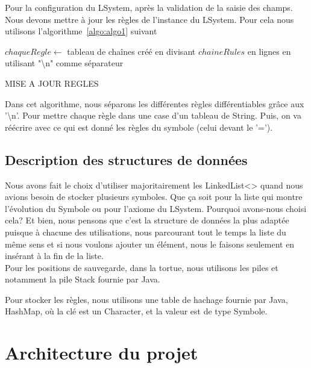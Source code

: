 \documentclass[12pt]{article}
\begin{document}
Pour la configuration du LSystem, après la validation de la saisie des champs. Nous devons mettre à jour les règles de l'instance du LSystem. Pour cela nous utilisons l'algorithme~\ref{algo:algo1} suivant\\
\begin{algorithm}[H]
\DontPrintSemicolon
\SetAlgoLined
{}
$chaqueRegle\gets$ tableau de chaînes créé en divisant $chaineRules$ en lignes en utilisant "\textbackslash n" comme séparateur\;
\caption{MISE A JOUR REGLES\label{algo:algo1}}
\end{algorithm}
Dans cet algorithme, nous séparons les différentes règles différentiables grâce aux '\textbackslash n'. Pour mettre chaque règle dans une case d'un tableau de String. Puis, on va réécrire avec ce qui est donné les règles du symbole (celui devant le '=').

\subsection{Description des structures de données}
Nous avons fait le choix d'utiliser majoritairement les LinkedList<> quand nous avions besoin de stocker plusieurs symboles. Que ça soit pour la liste qui montre l'évolution du Symbole ou pour l'axiome du LSystem.
Pourquoi avons-nous choisi cela?
Et bien, nous pensons que c'est la structure de données la plus adaptée puisque à chacune des utilisations, nous parcourant tout le temps la liste du même sens et si nous voulons ajouter un élément, nous le faisons seulement en insérant à la fin de la liste.\\

Pour les positions de sauvegarde, dans la tortue, nous utilisons les piles et notamment la pile Stack fournie par Java.

Pour stocker les règles, nous utilisons une table de hachage fournie par Java, HashMap, où la clé est un Character, et la valeur est de type Symbole. 

\section{Architecture du projet}
\end{document}
